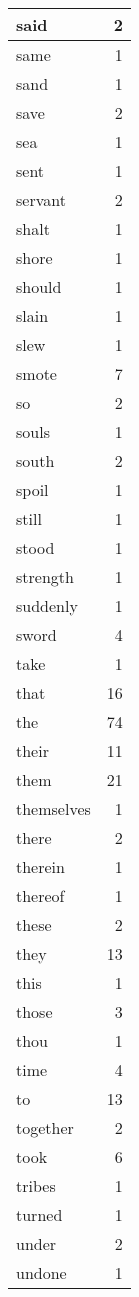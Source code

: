 \begin{center}
\begin{longtable}{l|r}
said & 2 \\ \hline
same & 1 \\ \hline
sand & 1 \\ \hline
save & 2 \\ \hline
sea & 1 \\ \hline
sent & 1 \\ \hline
servant & 2 \\ \hline
shalt & 1 \\ \hline
shore & 1 \\ \hline
should & 1 \\ \hline
slain & 1 \\ \hline
slew & 1 \\ \hline
smote & 7 \\ \hline
so & 2 \\ \hline
souls & 1 \\ \hline
south & 2 \\ \hline
spoil & 1 \\ \hline
still & 1 \\ \hline
stood & 1 \\ \hline
strength & 1 \\ \hline
suddenly & 1 \\ \hline
sword & 4 \\ \hline
take & 1 \\ \hline
that & 16 \\ \hline
the & 74 \\ \hline
their & 11 \\ \hline
them & 21 \\ \hline
themselves & 1 \\ \hline
there & 2 \\ \hline
therein & 1 \\ \hline
thereof & 1 \\ \hline
these & 2 \\ \hline
they & 13 \\ \hline
this & 1 \\ \hline
those & 3 \\ \hline
thou & 1 \\ \hline
time & 4 \\ \hline
to & 13 \\ \hline
together & 2 \\ \hline
took & 6 \\ \hline
tribes & 1 \\ \hline
turned & 1 \\ \hline
under & 2 \\ \hline
undone & 1 \\ \hline

\end{longtable}
\end{center}
